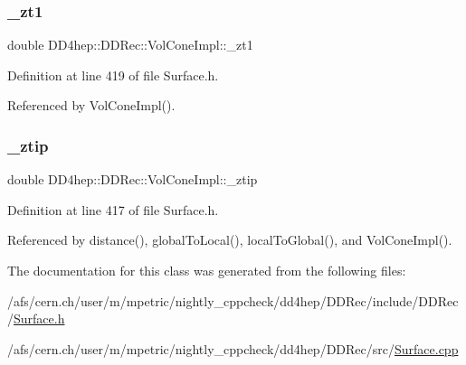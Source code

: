 \subsubsection{\texorpdfstring{\+\_\+zt1}{\_zt1}}
{\footnotesize\ttfamily double D\+D4hep\+::\+D\+D\+Rec\+::\+Vol\+Cone\+Impl\+::\+\_\+zt1\hspace{0.3cm}{\ttfamily [private]}}



Definition at line 419 of file Surface.\+h.



Referenced by Vol\+Cone\+Impl().

\hypertarget{class_d_d4hep_1_1_d_d_rec_1_1_vol_cone_impl_ae42d0cc1db6c972c012f3177cdeb935b}{}\label{class_d_d4hep_1_1_d_d_rec_1_1_vol_cone_impl_ae42d0cc1db6c972c012f3177cdeb935b} 
\subsubsection{\texorpdfstring{\+\_\+ztip}{\_ztip}}
{\footnotesize\ttfamily double D\+D4hep\+::\+D\+D\+Rec\+::\+Vol\+Cone\+Impl\+::\+\_\+ztip\hspace{0.3cm}{\ttfamily [private]}}



Definition at line 417 of file Surface.\+h.



Referenced by distance(), global\+To\+Local(), local\+To\+Global(), and Vol\+Cone\+Impl().



The documentation for this class was generated from the following files\+:\begin{DoxyCompactItemize}
\item 
/afs/cern.\+ch/user/m/mpetric/nightly\+\_\+cppcheck/dd4hep/\+D\+D\+Rec/include/\+D\+D\+Rec/\hyperlink{_surface_8h}{Surface.\+h}\item 
/afs/cern.\+ch/user/m/mpetric/nightly\+\_\+cppcheck/dd4hep/\+D\+D\+Rec/src/\hyperlink{_surface_8cpp}{Surface.\+cpp}\end{DoxyCompactItemize}
